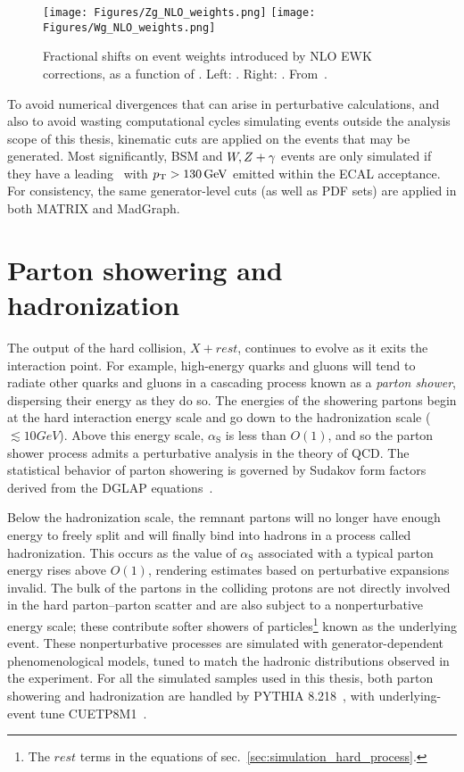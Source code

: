 \begin{figure}[hbtp]
  \begin{center}
    \texttt{[image: Figures/Zg\_NLO\_weights.png]}
    \texttt{[image: Figures/Wg\_NLO\_weights.png]}
    \caption{
    Fractional shifts on event weights introduced by NLO EWK corrections, as a function of \pTgamma. Left: \zinvg. Right: \wlng. From~\cite{ref:JHEP04(2015)018, ref:JHEP02(2016)057}.
    }
    \label{fig:NLO_EWK_weights}
  \end{center}
\end{figure}

To avoid numerical divergences that can arise in perturbative calculations, and also to avoid wasting computational cycles simulating events outside the analysis scope of this
thesis, kinematic cuts are applied on the events that may be generated. Most significantly, BSM and $\PW,\PZ + \Pgamma$ events are only simulated if they have a leading
\Pgamma\ with $\pT > 130\unit{GeV}$ emitted within the ECAL acceptance. For consistency, the same generator-level cuts (as well as PDF sets) are applied in both MATRIX and MadGraph.

\section{Parton showering and hadronization} \label{sec:simulation_parton_shower_hadronization}
The output of the hard collision, $X + rest$, continues to evolve as it exits the interaction point.
For example, high-energy quarks and gluons will tend to radiate other quarks and gluons in a cascading process
known as a \textit{parton shower}, dispersing their energy as they do so. The energies of the showering partons begin at the hard interaction energy scale
and go down to the hadronization scale (${\lesssim}10\unit{GeV}$). Above this energy scale, $\alpha_\mathrm{S}$ is less than $O(1)$, and so the parton
shower process admits a perturbative analysis in the theory of QCD.
The statistical behavior of parton showering is governed by Sudakov form factors derived from the DGLAP equations~\cite{ref:0034-4885/70/1/R02}.

Below the hadronization scale, the remnant partons will no longer have enough energy to freely split and will finally bind into hadrons
in a process called hadronization. This occurs as the value of $\alpha_\mathrm{S}$ associated with a typical parton energy rises above $O(1)$, rendering estimates
based on perturbative expansions invalid. The bulk of the partons in the colliding protons are not directly involved in the hard parton--parton scatter and are also subject
to a nonperturbative energy scale; these contribute softer showers of particles\footnote{The $rest$ terms in the equations of sec.~\ref{sec:simulation_hard_process}.}
known as the underlying event.
These nonperturbative processes are simulated with generator-dependent phenomenological models, tuned to match the hadronic distributions observed in the experiment.
For all the simulated samples used in this thesis, both parton showering and hadronization are handled by PYTHIA 8.218~\cite{ref:j.cpc.2015.01.024},
with underlying-event tune CUETP8M1~\cite{ref:epjc/s10052-016-3988-x}.

